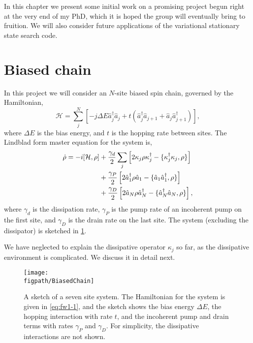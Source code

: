 In this chapter we present some initial work on a promising project begun right at the very end of my PhD, which it is hoped the group will eventually bring to fruition. We will also consider future applications of the variational stationary state search code.

\section{Biased chain}
In this project we will consider an \(N\)-site biased spin chain, governed by the Hamiltonian,
\begin{equation}
	\mathcal{H} = \sum_{j}^{N}\left[ -j \Delta E \hat{a}_{j}^{\dagger}\hat{a}_{j} + t\left( \hat{a}_{j}^{\dagger}\hat{a}_{j+1} + \hat{a}_{j}\hat{a}_{j+1}^{\dagger}\right)\right],
	\label{eq:fw1-1}
\end{equation}
where \(\Delta E\) is the bias energy, and \(t\) is the hopping rate between sites. The Lindblad form master equation for the system is, 
\begin{align}
	\dot{\rho} = -i[\mathcal{H}, \rho] &+ \frac{\gamma_{d}}{2} \sum_{j} \left[2\kappa_{j}\rho\kappa_{j}^{\dagger} - \{\kappa_{j}^{\dagger}\kappa_{j}, \rho\}\right] \notag \\
	&+ \frac{\gamma_{P}}{2}\left[2\hat{a}_{1}^{\dagger}\rho\hat{a}_{1} - \{\hat{a}_{1}\hat{a}_{1}^{\dagger}, \rho\}\right] \notag \\
	&+ \frac{\gamma_{D}}{2}\left[2\hat{a}_{N}\rho\hat{a}_{N}^{\dagger} - \{\hat{a}_{N}^{\dagger}\hat{a}_{N}, \rho\}\right],
	\label{eq:fw1-2}
\end{align}
where \(\gamma_{d}\) is the dissipation rate, \(\gamma_{P}\) is the pump rate of an incoherent pump on the first site, and \(\gamma_{D}\) is the drain rate on the last site. The system (excluding the dissipator) is sketched in \cref{fig:fw1-1}.

We have neglected to explain the dissipative operator \(\kappa_{j}\) so far, as the dissipative environment is complicated. We discuss it in detail next.

\begin{figure}[ht!]
	\centering
	\texttt{[image: \\figpath/BiasedChain]}
	\caption{\label{fig:fw1-1}A sketch of a seven site system. The Hamiltonian for the system is given in \cref{eq:fw1-1}, and the sketch shows the bias energy \(\Delta E\), the hopping interaction with rate \(t\), and the incoherent pump and drain terms with rates \(\gamma_{P}\) and \(\gamma_{D}\). For simplicity, the dissipative interactions are not shown.}
\end{figure}

